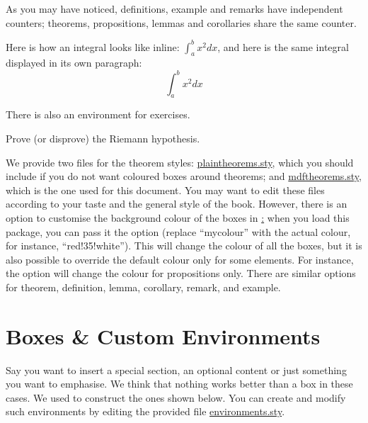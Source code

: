 As you may have noticed, definitions, example and remarks have 
independent counters; theorems, propositions, lemmas and corollaries 
share the same counter.

\begin{remark}
Here is how an integral looks like inline: $\int_{a}^{b} x^2 dx$, and 
here is the same integral displayed in its own paragraph:
\[\int_{a}^{b} x^2 dx\]
\end{remark}

There is also an environment for exercises.

\begin{exercise}
Prove (or disprove) the Riemann hypothesis.
\end{exercise}

We provide two files for the theorem styles: 
\href{style/plaintheorems.sty}{plaintheorems.sty}, which you should 
include if you do not want coloured boxes around theorems; and 
\href{style/mdftheorems.sty}{mdftheorems.sty}, which is the one used for 
this document. You may 
want to edit these files according to your taste and the general style 
of the book. However, there is an option to customise the background 
colour of the boxes in \href{style/mdftheorems.sty}: when you load this 
package, you can pass it the  option 
(replace \enquote{mycolour} with the actual colour, for instance, 
\enquote{red!35!white}). This will change the colour of all the boxes, 
but it is also possible to override the default colour only for some 
elements. For instance, the  
option will change the colour for propositions only. There are similar 
options for theorem, definition, lemma, corollary, remark, and example.

\section[Boxes \& Environments]{Boxes \& Custom Environments
}

Say you want to insert a special section, an optional content or just 
something you want to emphasise. We think that nothing works better than 
a box in these cases. We used  to construct the ones 
shown below. You can create and modify such environments by editing the 
provided file \href{style/environments.sty}{environments.sty}.


